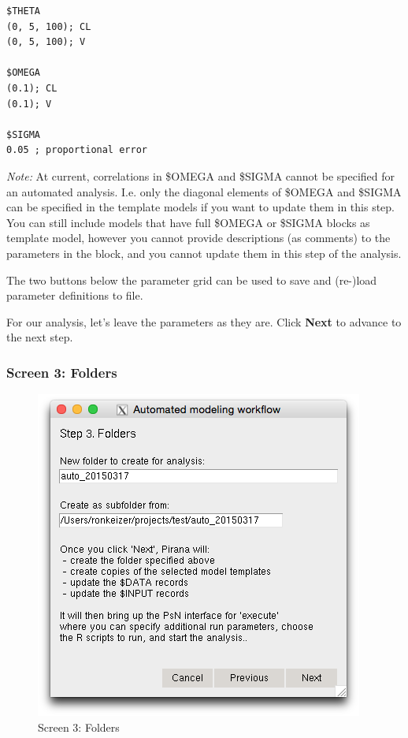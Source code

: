 \begin{verbatim}
$THETA
(0, 5, 100); CL
(0, 5, 100); V

$OMEGA
(0.1); CL
(0.1); V

$SIGMA
0.05 ; proportional error
\end{verbatim}

\emph{Note:} At current, correlations in \$OMEGA and \$SIGMA cannot be
specified for an automated analysis. I.e. only the diagonal elements of
\$OMEGA and \$SIGMA can be specified in the template models if you want
to update them in this step. You can still include models that have full
\$OMEGA or \$SIGMA blocks as template model, however you cannot provide
descriptions (as comments) to the parameters in the block, and you
cannot update them in this step of the analysis.

The two buttons below the parameter grid can be used to save and
(re-)load parameter definitions to file.

For our analysis, let's leave the parameters as they are. Click
\textbf{Next} to advance to the next step.


\subsubsection*{Screen 3: Folders}\label{screen-3-folders}

\begin{figure}[htbp]
\centering
\includegraphics[scale=0.5]{images/screen3.png}
\caption{Screen 3: Folders}
\end{figure}

